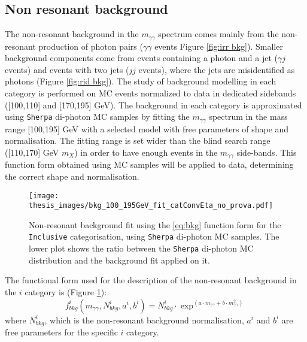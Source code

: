 \documentclass[a4paper, oneside, 11pt, openright]{book}
\begin{document}
 			\subsection{Non resonant background}
 				The non-resonant background in the $m_{\gamma\gamma}$ spectrum comes mainly from the non-resonant production of photon pairs ($\gamma\gamma$ events Figure \ref{fig:irr bkg}). Smaller background components come from events containing a photon and a jet ($\gamma j$ events) and events with two jets ($jj$ events), where the jets are misidentified as photons (Figure \ref{fig:rid bkg}). The study of background modelling in each category is performed on MC events normalized to data in dedicated sidebands ([100,110] and [170,195] GeV). The background in each category is approximated using \texttt{Sherpa} di-photon MC samples by fitting the $m_{\gamma\gamma}$ spectrum in the mass range [100,195] GeV with a selected model with free parameters of shape and normalisation. The fitting range is set wider than the blind search range ([110,170] GeV $m_X$) in order to have enough events in the $m_{\gamma\gamma}$ side-bands. This function form obtained using MC samples will be applied to data, determining the correct shape and normalisation.
 				
 				\begin{figure}[h]
 					\centering
 					\texttt{[image: thesis\_images/bkg\_100\_195GeV\_fit\_catConvEta\_no\_prova.pdf]}
 					\caption{Non-resonant background fit using the \ref{eq:bkg} function form for the \texttt{Inclusive} categorisation, using  \texttt{Sherpa} di-photon MC samples. The lower plot shows the ratio between the \texttt{Sherpa} di-photon MC distribution and the background fit applied on it.}
 					\label{fig:bkg_fit}
 				\end{figure}
 				The functional form used for the description of the non-resonant background in the $i$ category is (Figure \ref{fig:bkg_fit}):
 				\begin{equation}\label{eq:bkg}
 					f^i_{bkg}(m_{\gamma\gamma},N_{bkg}^i,a^i,b^i) = N_{bkg}^i\cdot\exp^{(a\cdot m_{\gamma\gamma}+b\cdot m_{\gamma\gamma}^2)}
 				\end{equation}
 				where $N_{bkg}^i$, which is the non-resonant background normalisation, $a^i$ and $b^i$ are free parameters for the specific $i$ category.
 				
\end{document}
